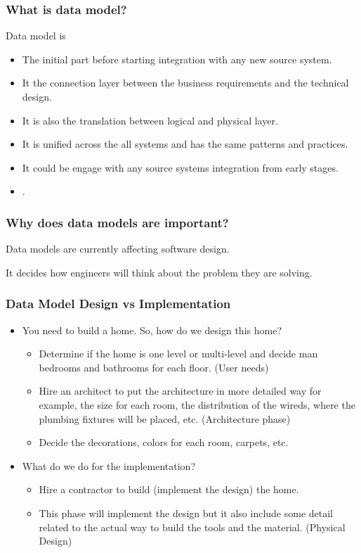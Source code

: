 
\begin{frame}
\frametitle{What is data model?}
Data model is
\begin{itemize}[<+->]
	\item The initial part before starting integration with any new source system.
	\item It the connection layer between the business requirements and the technical design.
	\item It is also the translation between logical and physical layer.
	\item It is unified across the all systems and has the same patterns and practices.
	\item It could be engage with any source systems integration from early stages.
	\item {}.
\end{itemize}
\end{frame}


\begin{frame}
\frametitle{Why does data models are important?}
\begin{wideitemize}	
\item Data models are currently affecting software design. 
\item It decides how engineers will think about the problem they are solving.
\end{wideitemize}
\end{frame}

\begin{frame}
\frametitle{Data Model Design vs Implementation}
	\begin{itemize}[<+->]
	\item You need to build a home. So, how do we design this home?
		\begin{itemize}[<+->]
		\item Determine if the home is one level or multi-level and decide man bedrooms and bathrooms for each floor. (User needs)
		\item Hire an architect to put the architecture in more detailed way for example, the size for each room, the distribution of the wireds, where the plumbing fixtures will be placed, etc. (Architecture phase)
		\item Decide the decorations, colors for each room, carpets, etc. 
		\end{itemize}
	\item What do we do for the implementation?
		\begin{itemize}[<+->]
		\item Hire a contractor to build (implement the design) the home. 
		\item This phase will implement the design but it also include some detail related to the actual way to build the tools and the material. (Physical Design)
		\end{itemize}		
	\end{itemize}
\end{frame}

